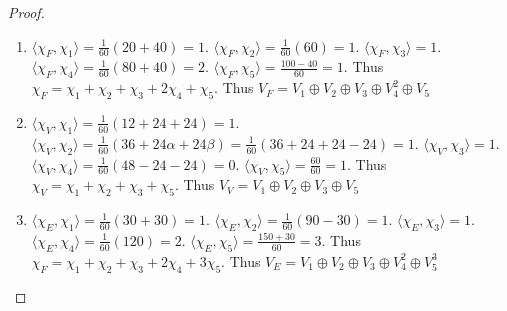 \documentclass{article}
\newcommand{\angles}[1]{\langle #1 \rangle}
\begin{document}
\begin{proof}
    \begin{enumerate}
        \item $\angles{\chi_F, \chi_1} = \frac{1}{60}\left(20 + 40\right) = 1$. $\angles{\chi_F, \chi_2} = \frac{1}{60}(60) = 1$. $\angles{\chi_F, \chi_3} = 1$. $\angles{\chi_F, \chi_4} = \frac{1}{60}\left(80 + 40\right) = 2$. $\angles{\chi_F, \chi_5} = \frac{100 - 40}{60} = 1$. Thus $\chi_F = \chi_1 + \chi_2 + \chi_3 + 2\chi_4 + \chi_5$. Thus $V_F = V_1 \oplus V_2 \oplus V_3 \oplus V_4^2 \oplus V_5$  
        \item $\angles{\chi_V, \chi_1} = \frac{1}{60}\left(12 + 24 + 24\right) = 1$. $\angles{\chi_V, \chi_2} = \frac{1}{60}(36 + 24\alpha + 24\beta) = \frac{1}{60}\left(36 + 24 + 24 - 24\right) = 1$. $\angles{\chi_V, \chi_3} = 1$. $\angles{\chi_V, \chi_4} = \frac{1}{60}\left(48 - 24 - 24\right) = 0$. $\angles{\chi_V, \chi_5} = \frac{60}{60} = 1$. Thus $\chi_V = \chi_1 + \chi_2 + \chi_3 + \chi_5$. Thus $V_V = V_1 \oplus V_2 \oplus V_3 \oplus V_5$
        \item $\angles{\chi_E, \chi_1} = \frac{1}{60}\left(30 + 30\right) = 1$. $\angles{\chi_E, \chi_2} = \frac{1}{60}(90 - 30) = 1$. $\angles{\chi_E, \chi_3} = 1$. $\angles{\chi_E, \chi_4} = \frac{1}{60}\left(120\right) = 2$. $\angles{\chi_E, \chi_5} = \frac{150 + 30}{60} = 3$. Thus $\chi_F = \chi_1 + \chi_2 + \chi_3 + 2\chi_4 + 3\chi_5$. Thus $V_E = V_1 \oplus V_2 \oplus V_3 \oplus V_4^2 \oplus V_5^3$  
    \end{enumerate}
\end{proof}

\bigskip
\end{document}

